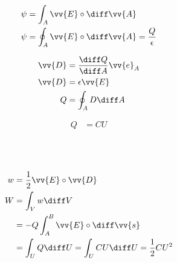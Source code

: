 \begin{boxleft}
\end{boxleft}\begin{boxrightshaded}
\begin{align}
\psi&=\int_A\vv{E}\circ\diff\vv{A}\\
\psi&=\oint_A\vv{E}\circ\diff\vv{A}=\frac{Q}{\epsilon}\\
\end{align}
\end{boxrightshaded}

\begin{boxleft}
\end{boxleft}\begin{boxrightshaded}
\begin{align}
\vv{D}&=\frac{\diff Q}{\diff A}\vv{e}_A\\
\vv{D}&=\epsilon\vv{E}\\
Q&=\oint_AD\diff A
\end{align}
\end{boxrightshaded}

\begin{boxleft}
\end{boxleft}\begin{boxrightshaded}
\begin{align}
Q&=CU
\end{align}
\end{boxrightshaded}

\begin{boxleft}
\\
\\
\end{boxleft}\begin{boxrightshaded}
\begin{align}
w&=\frac{1}{2}\vv{E}\circ\vv{D}\\
W &=\int_Vw\diff V\\
  &=-Q\int_A^B\vv{E}\circ\diff\vv{s}\\
  &=\int_U Q\diff U= \int_U CU \diff U=\frac{1}{2}CU^2
\end{align}
\end{boxrightshaded}

